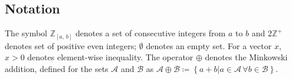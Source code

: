 \documentclass[10pt,journal]{IEEEtran}
\begin{document}


	
	\subsection{Notation}
	The symbol $\mathbb{Z}_{\left[a,\, b\right]}$ denotes a set of consecutive integers from $a$ to $b$ and $2\mathbb{Z}^{+}$ denotes set of positive even integers; $\emptyset$ denotes an empty set. For a vector $x$, $x>0$ denotes element-wise inequality. The operator $\oplus$ denotes the Minkowski addition, defined for the sets $\mathcal{A}$ and $\mathcal{B}$ as $	\mathcal{A}\oplus\mathcal{B}\coloneqq\left\{ a+b | a\in\mathcal{A}\,\forall b\in\mathcal{B}\right\}$.
	
\end{document}
